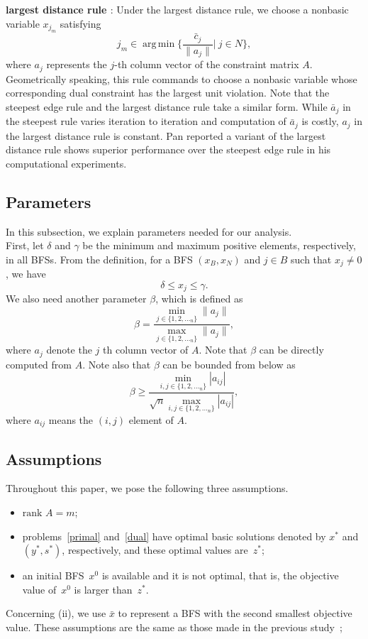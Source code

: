 \documentclass[12pt]{article}
\DeclareMathOperator*{\argmin}{arg\,min}
\begin{document}
{\bf largest distance rule \cite{pan2008}}: Under the largest distance rule, we choose a nonbasic variable $x_{j_m}$ satisfying
\begin{equation}
j_m \in \argmin\{\frac{\bar{c}_j}{\|a_j\|}|~j\in N\}, \label{largest}
\end{equation}
where $a_j$ represents the $j$-th column vector of the constraint matrix $A$. 
Geometrically speaking, this rule commands to choose a nonbasic variable whose corresponding dual constraint has the largest unit violation. 
Note that the steepest edge rule and the largest distance rule take a similar form. 
While $\bar{a}_j$ in the steepest rule varies iteration to iteration and computation of $\bar{a}_j$ is costly, $a_j$ in the largest distance rule is constant. 
Pan \cite{pan2010} reported a variant of the largest distance rule shows superior performance over the steepest edge rule in his computational experiments.
%
\subsection{Parameters}\label{parameters}
In this subsection, we explain parameters needed for our analysis. \\

First, let $\delta$ and $\gamma$ be  the minimum and maximum positive elements, respectively, in all BFSs. 
From the definition, for a BFS $(x_B,x_N)$ and $j \in B$ such that $x_j\not=0$, we have
\[
\delta\le x_j\le \gamma.
\]
We also need another parameter $\beta$, which is defined as 
\begin{equation}
\beta=\frac{\min_{j\in \{1,2,\dots_n\}}\|a_j\|}{\max_{j\in \{1,2,\dots_n\}}\|a_j\|}, \label{beta}
\end{equation}
where $a_j$ denote the $j$ th column vector of $A$.  
Note that $\beta$ can be directly computed from $A$. 
Note also that $\beta$ can be bounded from below as 
\[
\beta\ge \frac{\min_{i,j\in \{1,2,\dots_n\}}|a_{ij}|}{\sqrt{n}\max_{i,j\in \{1,2,\dots_n\}}|a_{ij}|},
\]
where $a_{ij}$ means the $(i,j)$ element of $A$.
%
\subsection{Assumptions}\label{assumptions}
Throughout this paper, we pose the following three assumptions.
\begin{itemize}
  \item[(i)] $\text{rank~} A = m$;
  \item[(ii)] problems~\eqref{primal} and~\eqref{dual} have optimal basic solutions denoted by $x^*$ and $(y^*, s^*)$, respectively, and these optimal values are~$z^*$;
  \item[(iii)] an initial BFS~$x^0$ is available and it is not optimal, that is, the objective value of~$x^{0}$ is larger than~$z^*$.
\end{itemize}
%
Concerning (ii), we use $\bar{x}$ to represent a BFS with the second smallest objective value.
These assumptions are the same as those made in the previous study~\cite{km2013}; 
\end{document}
